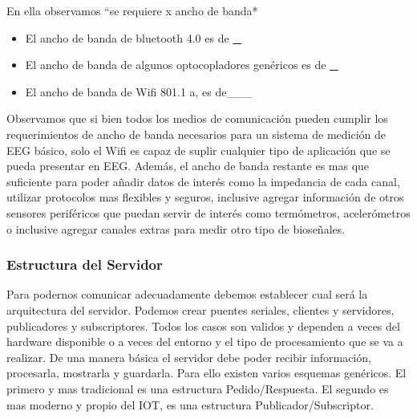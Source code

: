 En ella observamos “se requiere x ancho de banda*\\
\begin{itemize}
\item El ancho de banda de bluetooth 4.0 es de \uline{\_}\\
\item El ancho de banda de algunos optocopladores genéricos es de \uline{\_}\\
\item El ancho de banda de Wifi 801.1 a, es de\_\_\_\\
\end{itemize}

Observamos que si bien todos los medios de comunicación pueden cumplir los requerimientos de ancho de banda necesarios para un sistema de medición de EEG básico, solo el Wifi es capaz de suplir cualquier tipo de aplicación que se pueda presentar en EEG. Además, el ancho de banda restante es mas que suficiente para poder añadir datos de interés como la impedancia de cada canal, utilizar protocolos mas flexibles y seguros, inclusive agregar información de otros sensores periféricos que puedan servir de interés como termómetros, acelerómetros o inclusive agregar canales extras para medir otro tipo de bioseñales.\\

\subsubsection{Estructura del Servidor}
\label{sec:org3c6a850}
Para podernos comunicar adecuadamente debemos establecer cual será la arquitectura del servidor. Podemos crear puentes seriales, clientes y servidores, publicadores y subscriptores. Todos los casos son validos y dependen a veces del hardware disponible o a veces del entorno y el tipo de procesamiento que se va a realizar. De una manera básica el servidor debe poder recibir información, procesarla, mostrarla y guardarla. Para ello existen varios esquemas genéricos. El primero y mas tradicional es una estructura Pedido/Respuesta. El segundo es mas moderno y propio del IOT, es una estructura Publicador/Subscriptor.\\

